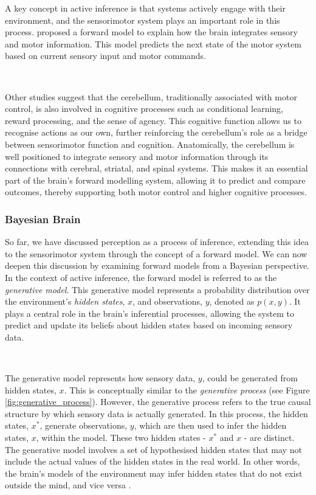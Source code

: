\documentclass{article}
\begin{document}
A key concept in active inference is that systems actively engage with their environment, and the sensorimotor system plays an important role in this process. \citet{miall1996forward} proposed a forward model to explain how the brain integrates sensory and motor information. This model predicts the next state of the motor system based on current sensory input and motor commands.

\

Other studies suggest that the cerebellum, traditionally associated with motor control, is also involved in cognitive processes such as conditional learning, reward processing, and the sense of agency. \citep{welniarz2021forward} This cognitive function allows us to recognise actions as our own, further reinforcing the cerebellum’s role as a bridge between sensorimotor function and cognition. Anatomically, the cerebellum is well positioned to integrate sensory and motor information through its connections with cerebral, striatal, and spinal systems. This makes it an essential part of the brain’s forward modelling system, allowing it to predict and compare outcomes, thereby supporting both motor control and higher cognitive processes.

\subsubsection{Bayesian Brain}

So far, we have discussed perception as a process of inference, extending this idea to the sensorimotor system through the concept of a forward model. We can now deepen this discussion by examining forward models from a Bayesian perspective. In the context of active inference, the forward model is referred to as the \textit{generative model}. This generative model represents a probability distribution over the environment's \textit{hidden states}, $x$, and observations, $y$, denoted as $p(x, y)$. It plays a central role in the brain’s inferential processes, allowing the system to predict and update its beliefs about hidden states based on incoming sensory data.

\

The generative model represents how sensory data, $y$, could be generated from hidden states, $x$. This is conceptually similar to the \textit{generative process} (see Figure \ref{fig:generative_process}). However, the generative process refers to the true causal structure by which sensory data is actually generated. In this process, the hidden states, $x^*$, generate observations, $y$, which are then used to infer the hidden states, $x$, within the model. These two hidden states - $x^*$ and $x$ - are distinct. The generative model involves a set of hypothesised hidden states that may not include the actual values of the hidden states in the real world. In other words, the brain’s models of the environment may infer hidden states that do not exist outside the mind, and vice versa \citep{parr2022ActiveInference}.
\end{document}
